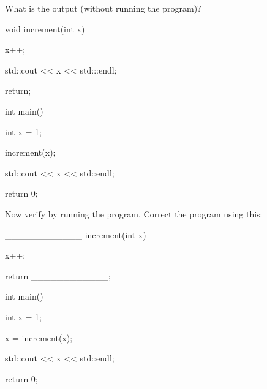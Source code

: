 What is the output (without running the program)?



\begin{consolethree}[escapeinside=||]

void increment(int x)

{

    x++;

    std::cout << x << std:::endl;

    return;

}



int main()

{

    int x = 1;

    increment(x);

    std::cout << x << std::endl;



    return 0;

}

\end{consolethree}



Now verify by running the program. Correct the program using this:



\begin{consolethree}[escapeinside=||]

____________ increment(int x)

{

    x++;

    return ____________;

}



int main()

{

    int x = 1;

    x = increment(x);

    std::cout << x << std::endl;

    return 0;

}

\end{consolethree}

